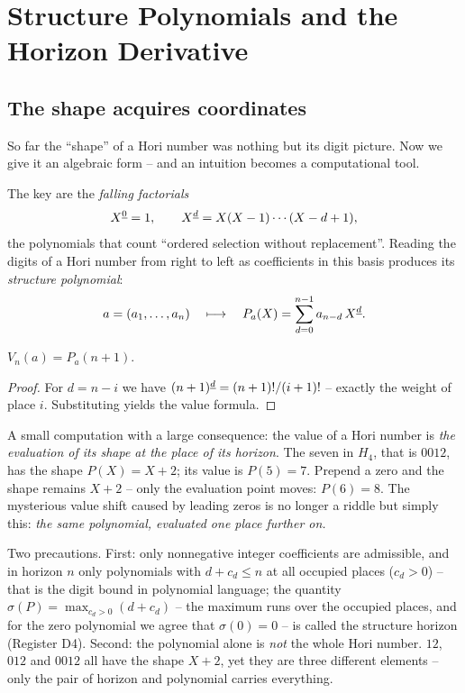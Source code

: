 \chapter{Structure Polynomials and the Horizon Derivative}
\label{ch:strukturpolynome}


\section{The shape acquires coordinates}

So far the ``shape'' of a Hori number was nothing but its digit
picture. Now we give it an algebraic form -- and an intuition
becomes a computational tool.

The key are the \emph{falling factorials}
\[
X^{\underline{0}}=1,\qquad X^{\underline{d}}=X(X-1)\cdots(X-d+1),
\]
the polynomials that count ``ordered selection without
replacement''. Reading the digits of a Hori number from right to
left as coefficients in this basis produces its \emph{structure
polynomial}:
\[
a=(a_1,\ldots,a_n)
\quad\longmapsto\quad
P_a(X)=\sum_{d=0}^{n-1}a_{n-d}\,X^{\underline{d}} .
\]

\begin{satz}
$V_n(a)=P_a(n+1)$.
\end{satz}

\begin{proof}
For $d=n-i$ we have $(n+1)^{\underline{d}}=(n+1)!/(i+1)!$ -- exactly the
weight of place $i$. Substituting yields the value formula.
\end{proof}

A small computation with a large consequence: the value of a Hori
number is \emph{the evaluation of its shape at the place of its
horizon}. The seven in $H_4$, that is $0012$, has the shape
$P(X)=X+2$; its value is $P(5)=7$. Prepend a zero and the shape
remains $X+2$ -- only the evaluation point moves: $P(6)=8$. The
mysterious value shift caused by leading zeros is no longer a
riddle but simply this: \emph{the same polynomial, evaluated one
place further on.}

Two precautions. First: only nonnegative integer coefficients are
admissible, and in horizon $n$ only polynomials with $d+c_d\le n$
at all occupied places ($c_d>0$) --
that is the digit bound in polynomial language; the quantity
$\sigma(P)=\max_{c_d>0}(d+c_d)$ -- the maximum runs over the
occupied places, and for the zero polynomial we agree that
$\sigma(0)=0$ -- is called the structure horizon (Register D4).
Second: the polynomial alone is \emph{not} the whole Hori number.
$12$, $012$ and $0012$ all have the shape $X+2$, yet they are three
different elements -- only the pair of horizon and polynomial
carries everything.

